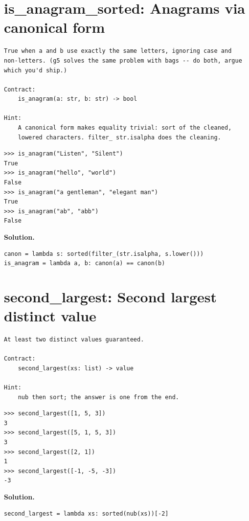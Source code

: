 \documentclass[10pt,letterpaper]{book}
\begin{document}
\section{is\_anagram\_sorted: Anagrams via canonical form}
\begin{lstlisting}[style=ex]
True when a and b use exactly the same letters, ignoring case and
non-letters. (g5 solves the same problem with bags -- do both, argue
which you'd ship.)

Contract:
    is_anagram(a: str, b: str) -> bool

Hint:
    A canonical form makes equality trivial: sort of the cleaned,
    lowered characters. filter_ str.isalpha does the cleaning.
\end{lstlisting}
\begin{lstlisting}[style=ex]
>>> is_anagram("Listen", "Silent")
True
>>> is_anagram("hello", "world")
False
>>> is_anagram("a gentleman", "elegant man")
True
>>> is_anagram("ab", "abb")
False
\end{lstlisting}
\noindent\textbf{Solution.}
\begin{lstlisting}[style=code]
canon = lambda s: sorted(filter_(str.isalpha, s.lower()))
is_anagram = lambda a, b: canon(a) == canon(b)
\end{lstlisting}

\section{second\_largest: Second largest distinct value}
\begin{lstlisting}[style=ex]
At least two distinct values guaranteed.

Contract:
    second_largest(xs: list) -> value

Hint:
    nub then sort; the answer is one from the end.
\end{lstlisting}
\begin{lstlisting}[style=ex]
>>> second_largest([1, 5, 3])
3
>>> second_largest([5, 1, 5, 3])
3
>>> second_largest([2, 1])
1
>>> second_largest([-1, -5, -3])
-3
\end{lstlisting}
\noindent\textbf{Solution.}
\begin{lstlisting}[style=code]
second_largest = lambda xs: sorted(nub(xs))[-2]
\end{lstlisting}
\end{document}
